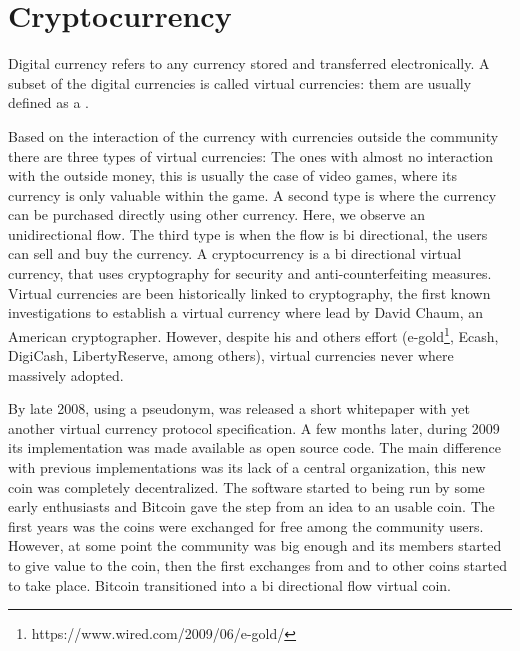 
\section{Cryptocurrency}
Digital currency refers to any currency stored and transferred
  electronically.
  A subset of the digital currencies is called virtual currencies: them are
  usually defined\cite{bcentraleuro} as a .

Based on the interaction of the currency with currencies outside the
  community there are three types of virtual currencies: The ones with almost
  no interaction with the outside money, this is usually the case of video
  games, where its currency is only valuable within the game. A second
  type is where the currency can be purchased directly using other currency.
  Here, we observe an unidirectional flow. The third type is when the flow is
  bi directional, the users can sell and buy the currency.
A cryptocurrency is a bi directional virtual currency, that uses cryptography
  for security and anti-counterfeiting measures. Virtual currencies are been
  historically linked to cryptography, the first known investigations
  \cite{chaum1983blind} to establish a virtual currency where lead by David
  Chaum, an American cryptographer. However, despite his and others effort
  (e-gold\footnote{https://www.wired.com/2009/06/e-gold/},
   Ecash\cite{chaum1990untraceable},
   DigiCash, LibertyReserve, among others), virtual currencies never where
   massively adopted.

By late 2008, using a pseudonym, was released a short
  whitepaper\cite{nakamoto2008bitcoin} with yet another virtual currency
  protocol specification. A few months later, during 2009 its implementation
  was made available as open source code. The main difference with previous
  implementations was its lack of a central organization, this new coin was
  completely decentralized. The software started to being run by some early
  enthusiasts and Bitcoin gave the step from an idea to an usable coin. The
  first years was the coins were exchanged for free among the community users.
  However, at some point the community was big enough and its members started
  to give value to the coin, then the first exchanges from and to other coins
  started to take place. Bitcoin transitioned into a bi directional flow
  virtual coin.

